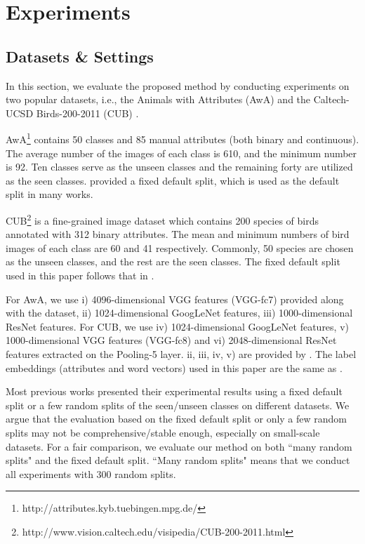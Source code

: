 \documentclass{article}
\begin{document}
\section{Experiments}
\subsection{Datasets \& Settings}
In this section, we evaluate the proposed method by conducting experiments on two popular datasets, i.e., the Animals with Attributes (AwA) \cite{lampert2009learning} and the Caltech-UCSD Birds-200-2011 (CUB) \cite{WahCUB_200_2011}.

AwA\footnote{http://attributes.kyb.tuebingen.mpg.de/} contains 50 classes and 85 manual attributes (both binary and continuous). The average number of the images of each class is 610, and the minimum number is 92. Ten classes serve as the unseen classes and the remaining forty are utilized as the seen classes. \cite{lampert2014attribute} provided a fixed default split, which is used as the default split in many works.

CUB\footnote{http://www.vision.caltech.edu/visipedia/CUB-200-2011.html} is a fine-grained image dataset which contains 200 species of birds annotated with 312 binary attributes.  The mean and minimum numbers of bird images of each class are 60 and 41 respectively. Commonly, 50 species are chosen as the unseen classes, and the rest are the seen classes. The fixed default split used in this paper follows that in \cite{wang2016relational}.


For AwA, we use i) 4096-dimensional VGG features (VGG-fc7) provided along with the dataset, ii) 1024-dimensional GoogLeNet features, iii) 1000-dimensional ResNet features. For CUB, we use iv) 1024-dimensional GoogLeNet features, v) 1000-dimensional VGG features (VGG-fc8) and vi) 2048-dimensional ResNet features extracted on the Pooling-5 layer. ii, iii, iv, v) are provided by \cite{wang2016relational}. The label embeddings (attributes and word vectors) used in this paper are the same as \cite{wang2016relational}.


Most previous works presented their experimental results using a fixed default split or a few random splits of the seen/unseen classes  on different datasets. We argue that the evaluation based on the fixed default split or only a few random splits may not be comprehensive/stable enough, especially on small-scale datasets. For a fair comparison, we evaluate our method on both ``many random splits" and the fixed default split. ``Many random splits" means that we conduct all experiments with 300 random splits.
\end{document}
